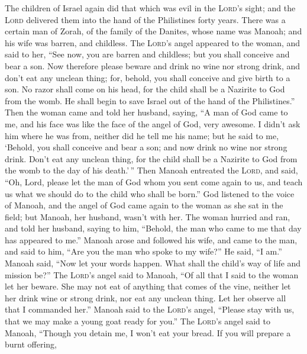  The children of Israel again did that which was evil in
the \textsc{Lord}'s sight; and the \textsc{Lord} delivered them into the
hand of the Philistines forty years.  There was a certain
man of Zorah, of the family of the Danites, whose name was Manoah; and
his wife was barren, and childless.  The \textsc{Lord}'s
angel appeared to the woman, and said to her, ``See now, you are barren
and childless; but you shall conceive and bear a son.  Now
therefore please beware and drink no wine nor strong drink, and don't
eat any unclean thing;  for, behold, you shall conceive
and give birth to a son. No razor shall come on his head, for the child
shall be a Nazirite to God from the womb. He shall begin to save Israel
out of the hand of the Philistines.''  Then the woman came
and told her husband, saying, ``A man of God came to me, and his face
was like the face of the angel of God, very awesome. I didn't ask him
where he was from, neither did he tell me his name;  but
he said to me, `Behold, you shall conceive and bear a son; and now drink
no wine nor strong drink. Don't eat any unclean thing, for the child
shall be a Nazirite to God from the womb to the day of his death.'\,''
 Then Manoah entreated the \textsc{Lord}, and said, ``Oh,
Lord, please let the man of God whom you sent come again to us, and
teach us what we should do to the child who shall be born.''
 God listened to the voice of Manoah, and the angel of God
came again to the woman as she sat in the field; but Manoah, her
husband, wasn't with her.  The woman hurried and ran, and
told her husband, saying to him, ``Behold, the man who came to me that
day has appeared to me.''  Manoah arose and followed his
wife, and came to the man, and said to him, ``Are you the man who spoke
to my wife?'' He said, ``I am.''  Manoah said, ``Now let
your words happen. What shall the child's way of life and mission be?''
 The \textsc{Lord}'s angel said to Manoah, ``Of all that
I said to the woman let her beware.  She may not eat of
anything that comes of the vine, neither let her drink wine or strong
drink, nor eat any unclean thing. Let her observe all that I commanded
her.''  Manoah said to the \textsc{Lord}'s angel,
``Please stay with us, that we may make a young goat ready for you.''
 The \textsc{Lord}'s angel said to Manoah, ``Though you
detain me, I won't eat your bread. If you will prepare a burnt offering,
